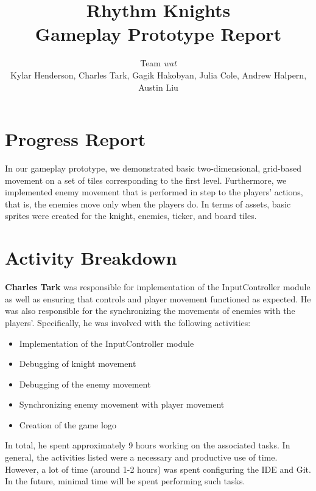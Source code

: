 \documentclass[]{article}
\makeatletter
\renewcommand{\maketitle}{\bgroup\setlength{\parindent}{0pt}
\begin{flushleft}
  \huge{\textbf{\@title}}

  \large{\@author}
\end{flushleft}\egroup
}
\makeatother
\begin{document}
\title{\textbf{Rhythm Knights} \\ Gameplay Prototype Report}
\author{Team \emph{wat} \\
  \small{Kylar Henderson, Charles Tark, 
    Gagik Hakobyan, Julia Cole, Andrew Halpern, Austin Liu}}
\date{} %

\section*{Progress Report}
In our gameplay prototype, we demonstrated basic two-dimensional,
grid-based movement on a set of tiles corresponding to the first
level.  Furthermore, we implemented enemy movement that is performed
in step to the players' actions, that is, the enemies move only when
the players do.  In terms of assets, basic sprites were created for
the knight, enemies, ticker, and board tiles.

\section*{Activity Breakdown}

\textbf{Charles Tark} 
was responsible for implementation of the InputController module as
well as ensuring that controls and player movement functioned as
expected.  He was also responsible for the synchronizing the movements
of enemies with the players'.  Specifically, he was involved with the
following activities:
\begin{itemize}
\item Implementation of the InputController module
\item Debugging of knight movement
\item Debugging of the enemy movement
\item Synchronizing enemy movement with player movement
\item Creation of the game logo
\end{itemize}

In total, he spent approximately 9 hours working on the associated
tasks.  In general, the activities listed were a necessary and
productive use of time.  However, a lot of time (around 1-2 hours) was
spent configuring the IDE and Git.  In the future, minimal time will
be spent performing such tasks.\\
\end{document}
